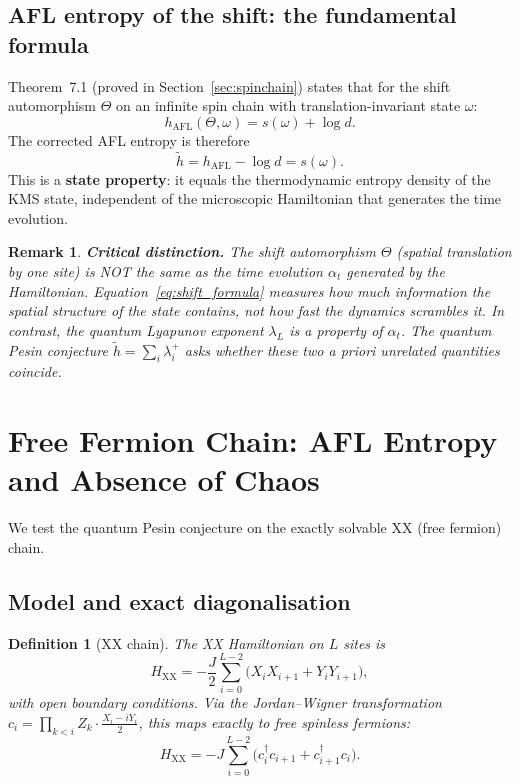 \documentclass[12pt,a4paper]{article}
\newtheorem{definition}[theorem]{Definition}
\newtheorem{remark}[theorem]{Remark}
\begin{document}
\subsection{AFL entropy of the shift: the fundamental formula}

Theorem~7.1 (proved in Section~\ref{sec:spinchain}) states that for the shift
automorphism $\Theta$ on an infinite spin chain with translation-invariant state
$\omega$:
\begin{equation}
  h_{\mathrm{AFL}}(\Theta, \omega) = s(\omega) + \log d.
  \label{eq:shift_formula}
\end{equation}
The corrected AFL entropy is therefore
\begin{equation}
  \widetilde{h} = h_{\mathrm{AFL}} - \log d = s(\omega).
  \label{eq:corrected_afl}
\end{equation}
This is a \textbf{state property}: it equals the thermodynamic entropy density of the
KMS state, independent of the microscopic Hamiltonian that generates the time
evolution.

\begin{remark}
  \textbf{Critical distinction.}  The shift automorphism $\Theta$ (spatial translation
  by one site) is NOT the same as the time evolution $\alpha_t$ generated by the
  Hamiltonian.  Equation~\eqref{eq:shift_formula} measures how much information the
  spatial structure of the state contains, not how fast the dynamics scrambles it.
  In contrast, the quantum Lyapunov exponent $\lambda_L$ is a property of $\alpha_t$.
  The quantum Pesin conjecture $\widetilde{h} = \sum_i \lambda_i^+$ asks whether these
  two a priori unrelated quantities coincide.
\end{remark}

\section{Free Fermion Chain: AFL Entropy and Absence of Chaos}
\label{sec:ff}

We test the quantum Pesin conjecture on the exactly solvable XX (free fermion) chain.

\subsection{Model and exact diagonalisation}

\begin{definition}[XX chain]
  The XX Hamiltonian on $L$ sites is
  \[
    H_{\mathrm{XX}} = -\frac{J}{2} \sum_{i=0}^{L-2}
      \bigl(X_i X_{i+1} + Y_i Y_{i+1}\bigr),
  \]
  with open boundary conditions.  Via the Jordan--Wigner transformation
  $c_i = \prod_{k<i} Z_k \cdot \tfrac{X_i - iY_i}{2}$, this maps exactly to
  free spinless fermions:
  \[
    H_{\mathrm{XX}} = -J \sum_{i=0}^{L-2}\bigl(c_i^\dagger c_{i+1} + c_{i+1}^\dagger c_i\bigr).
  \]
\end{definition}
\end{document}
